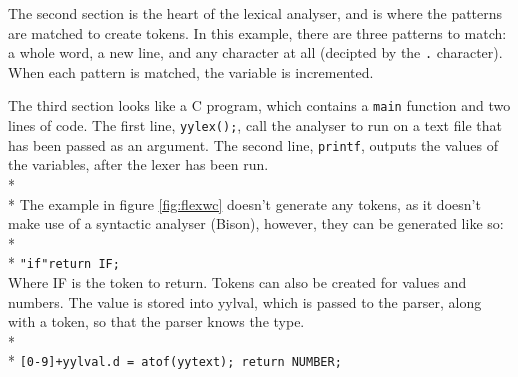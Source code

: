 \documentclass[12pt]{report}
\begin{document}
The second section is the heart of the lexical analyser, and is where the patterns are matched to create tokens.  In this example, there are three patterns to match: a whole word, a new line, and any character at all (decipted by the \texttt{.} character).  When each pattern is matched, the variable is incremented.

The third section looks like a C program, which contains a \texttt{main} function and two lines of code.  The first line, \texttt{yylex();}, call the analyser to run on a text file that has been passed as an argument.  The second line, \texttt{printf}, outputs the values of the variables, after the lexer has been run.
\\*
\\*
The example in figure \ref{fig:flexwc} doesn't generate any tokens, as it doesn't make use of a syntactic analyser (Bison), however, they can be generated like so:
\\*
\\*
\texttt{"if"\quad\quad return IF;}\\
Where IF is the token to return.  Tokens can also be created for values and numbers.  The value is stored into yylval, which is passed to the parser, along with a token, so that the parser knows the type.
\\*
\\*
\texttt{[0-9]+\quad\quad yylval.d = atof(yytext); return NUMBER;}
\end{document}
